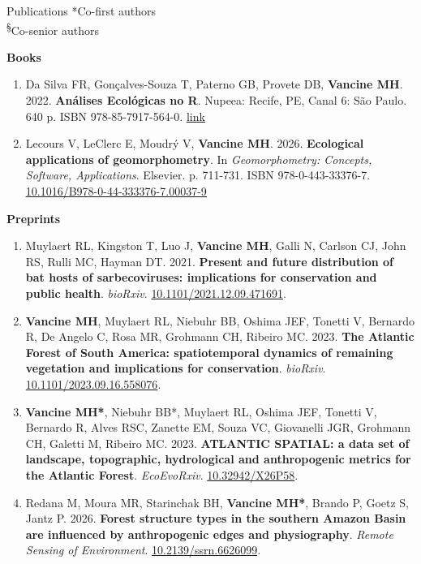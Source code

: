 \documentclass{resume}
\begin{document}
\begin{rSection}{Publications}
*Co-first authors\\
\textsuperscript{\S}Co-senior authors

\textbf{Books}
\begin{enumerate} 
\item Da Silva FR, Gonçalves-Souza T, Paterno GB, Provete DB, \textbf{Vancine MH}. 2022. \textbf{Análises Ecológicas no R}. Nupeea: Recife, PE, Canal 6: São Paulo. 640 p. ISBN 978-85-7917-564-0. \href{https://analises-ecologicas.com/}{\underline{link}}
\item Lecours V, LeClerc E, Moudrý V, \textbf{Vancine MH}. 2026. \textbf{Ecological applications of geomorphometry}. In \textit{Geomorphometry: Concepts, Software, Applications}. Elsevier. p. 711-731. ISBN 978-0-443-33376-7. \href{https://doi.org/10.1016/B978-0-44-333376-7.00037-9}{\underline{10.1016/B978-0-44-333376-7.00037-9}}
\end{enumerate} 

\textbf{Preprints}
\begin{enumerate} 
\item Muylaert RL, Kingston T, Luo J, \textbf{Vancine MH}, Galli N, Carlson CJ, John RS, Rulli MC, Hayman DT. 2021. \textbf{Present and future distribution of bat hosts of sarbecoviruses: implications for conservation and public health}. \textit{bioRxiv}. \href{https://doi.org/10.1101/2021.12.09.471691}{10.1101/2021.12.09.471691}.

\item \textbf{Vancine MH}, Muylaert RL, Niebuhr BB, Oshima JEF, Tonetti V, Bernardo R, De Angelo C, Rosa MR, Grohmann CH, Ribeiro MC. 2023. \textbf{The Atlantic Forest of South America: spatiotemporal dynamics of remaining vegetation and implications for conservation}. \textit{bioRxiv}. \href{https://doi.org/10.1101/2023.09.16.558076}{10.1101/2023.09.16.558076}.

\item \textbf{Vancine MH*}, Niebuhr BB*, Muylaert RL, Oshima JEF, Tonetti V, Bernardo R, Alves RSC, Zanette EM, Souza VC, Giovanelli JGR, Grohmann CH, Galetti M, Ribeiro MC. 2023. \textbf{ATLANTIC SPATIAL: a data set of landscape, topographic, hydrological and anthropogenic metrics for the Atlantic Forest}. \textit{EcoEvoRxiv}. \href{https://doi.org/10.32942/X26P58}{10.32942/X26P58}.

\item Redana M, Moura MR, Starinchak BH, \textbf{Vancine MH*}, Brando P, Goetz S, Jantz P. 2026. \textbf{Forest structure types in the southern Amazon Basin are influenced by anthropogenic edges and physiography}. \textit{Remote Sensing of Environment}. \href{https://doi.org/10.2139/ssrn.6626099}{10.2139/ssrn.6626099}.
\end{enumerate} 


\end{rSection}
\end{document}
